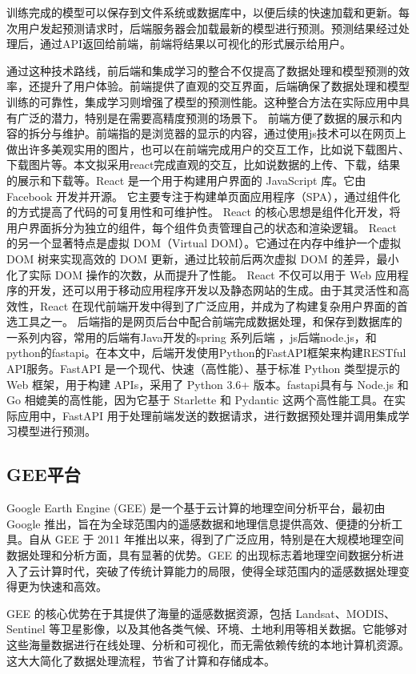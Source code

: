 \documentclass{article}
\begin{document}
	训练完成的模型可以保存到文件系统或数据库中，以便后续的快速加载和更新。每次用户发起预测请求时，后端服务器会加载最新的模型进行预测。预测结果经过处理后，通过API返回给前端，前端将结果以可视化的形式展示给用户。
	
	通过这种技术路线，前后端和集成学习的整合不仅提高了数据处理和模型预测的效率，还提升了用户体验。前端提供了直观的交互界面，后端确保了数据处理和模型训练的可靠性，集成学习则增强了模型的预测性能。这种整合方法在实际应用中具有广泛的潜力，特别是在需要高精度预测的场景下。
	前端方便了数据的展示和内容的拆分与维护。前端指的是浏览器的显示的内容，通过使用js技术可以在网页上做出许多美观实用的图片，也可以在前端完成用户的交互工作，比如说下载图片、下载图片等。本文拟采用react完成直观的交互，比如说数据的上传、下载，结果的展示和下载等。React 是一个用于构建用户界面的 JavaScript 库。它由 Facebook 开发并开源。
	它主要专注于构建单页面应用程序（SPA），通过组件化的方式提高了代码的可复用性和可维护性。 React 的核心思想是组件化开发，将用户界面拆分为独立的组件，每个组件负责管理自己的状态和渲染逻辑。 React 的另一个显著特点是虚拟 DOM（Virtual DOM）。它通过在内存中维护一个虚拟 DOM 树来实现高效的 DOM 更新，通过比较前后两次虚拟 DOM 的差异，最小化了实际 DOM 操作的次数，从而提升了性能。 React 不仅可以用于 Web 应用程序的开发，还可以用于移动应用程序开发以及静态网站的生成。由于其灵活性和高效性，React 在现代前端开发中得到了广泛应用，并成为了构建复杂用户界面的首选工具之一。
	后端指的是网页后台中配合前端完成数据处理，和保存到数据库的一系列内容，常用的后端有Java开发的spring 系列后端 ，js后端node.js，和python的fastapi。在本文中，后端开发使用Python的FastAPI框架来构建RESTful API服务。FastAPI 是一个现代、快速（高性能）、基于标准 Python 类型提示的 Web 框架，用于构建 APIs，采用了 Python 3.6+ 版本。fastapi具有与 Node.js 和 Go 相媲美的高性能，因为它基于 Starlette 和 Pydantic 这两个高性能工具。在实际应用中，FastAPI 用于处理前端发送的数据请求，进行数据预处理并调用集成学习模型进行预测。
	
		
	\subsection{GEE平台}
	Google Earth Engine (GEE) 是一个基于云计算的地理空间分析平台，最初由 Google 推出，旨在为全球范围内的遥感数据和地理信息提供高效、便捷的分析工具。自从 GEE 于 2011 年推出以来，得到了广泛应用，特别是在大规模地理空间数据处理和分析方面，具有显著的优势。GEE 的出现标志着地理空间数据分析进入了云计算时代，突破了传统计算能力的局限，使得全球范围内的遥感数据处理变得更为快速和高效。
	
	GEE 的核心优势在于其提供了海量的遥感数据资源，包括 Landsat、MODIS、Sentinel 等卫星影像，以及其他各类气候、环境、土地利用等相关数据。它能够对这些海量数据进行在线处理、分析和可视化，而无需依赖传统的本地计算机资源。这大大简化了数据处理流程，节省了计算和存储成本。
	
\end{document}
